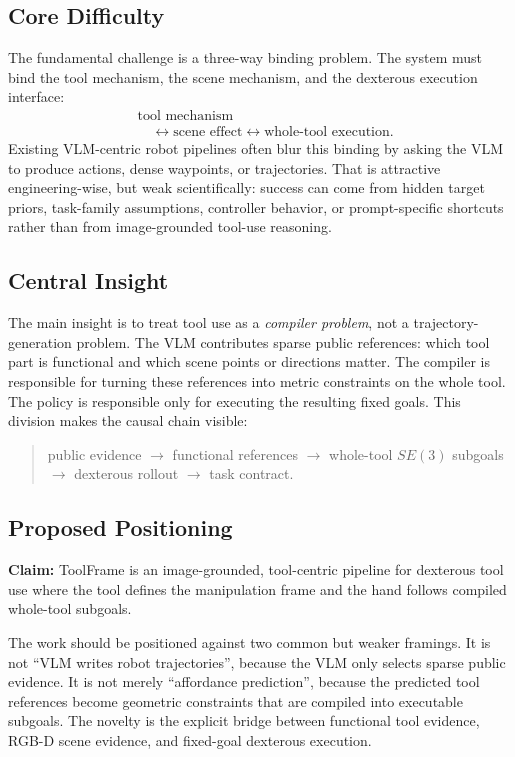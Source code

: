 \documentclass[letterpaper, 10 pt, conference]{ieeeconf}
\newcommand{\method}{ToolFrame}
\newcommand{\claim}[1]{\textbf{Claim:} #1}
\begin{document}
\subsection{Core Difficulty}
The fundamental challenge is a three-way binding problem. The system must bind
the tool mechanism, the scene mechanism, and the dexterous execution interface:
\begin{equation}
  \begin{aligned}
  &\text{tool mechanism}\\
  &\quad \longleftrightarrow \text{scene effect}
  \longleftrightarrow \text{whole-tool execution}.
  \end{aligned}
\end{equation}
Existing VLM-centric robot pipelines often blur this binding by asking the VLM
to produce actions, dense waypoints, or trajectories. That is attractive
engineering-wise, but weak scientifically: success can come from hidden target
priors, task-family assumptions, controller behavior, or prompt-specific
shortcuts rather than from image-grounded tool-use reasoning.

\subsection{Central Insight}
The main insight is to treat tool use as a \emph{compiler problem}, not a
trajectory-generation problem. The VLM contributes sparse public references:
which tool part is functional and which scene points or directions matter. The
compiler is responsible for turning these references into metric constraints on
the whole tool. The policy is responsible only for executing the resulting
fixed goals. This division makes the causal chain visible:
\begin{quote}
public evidence $\rightarrow$ functional references $\rightarrow$ whole-tool
$SE(3)$ subgoals $\rightarrow$ dexterous rollout $\rightarrow$ task contract.
\end{quote}

\subsection{Proposed Positioning}
\claim{\method{} is an image-grounded, tool-centric pipeline for dexterous tool
use where the tool defines the manipulation frame and the hand follows
compiled whole-tool subgoals.}

The work should be positioned against two common but weaker framings. It is not
``VLM writes robot trajectories'', because the VLM only selects sparse public
evidence. It is not merely ``affordance prediction'', because the predicted
tool references become geometric constraints that are compiled into executable
subgoals. The novelty is the explicit bridge between functional tool evidence,
RGB-D scene evidence, and fixed-goal dexterous execution.
\end{document}
